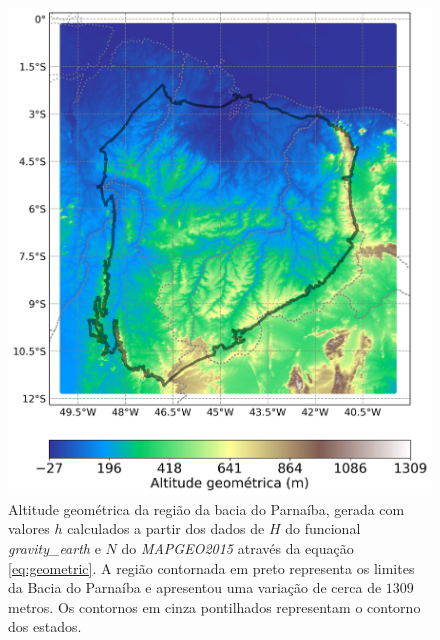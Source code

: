 \begin{figure}[H]
	\centering
	\includegraphics[scale=0.32]{figs/altitude geometrica da bacia do parnaiba.png}
	\caption{Altitude geométrica da região da bacia do Parnaíba, gerada com valores $h$ calculados a partir dos dados de $H$ do funcional \textit{gravity\_earth} e $N$ do \textit{MAPGEO2015} através da equação \ref{eq:geometric}. A região contornada em preto representa os limites da Bacia do Parnaíba e apresentou uma variação de cerca de $1309$ metros. Os contornos em cinza pontilhados representam o contorno dos estados.}	
	\label{fig:altitude geometrica grid}
\end{figure}

